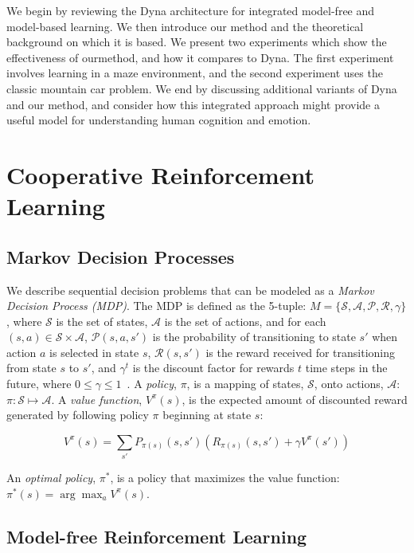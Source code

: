 \documentclass[letterpaper]{article}
\begin{document}
We begin by reviewing the Dyna architecture for integrated model-free and model-based learning. We then introduce our method and the theoretical background on which it is based. We present two experiments which show the effectiveness of ourmethod, and how it compares to Dyna. The first experiment involves learning in a maze environment, and the second experiment uses the classic mountain car problem. We end by discussing additional variants of Dyna and our method, and consider how this integrated approach might provide a useful model for understanding human cognition and emotion.

\section{Cooperative Reinforcement Learning}

\subsection{Markov Decision Processes}

We describe sequential decision problems that can be modeled as a \textit{Markov Decision Process (MDP)}. The MDP is defined as the 5-tuple: $M=\{\mathcal{S},\mathcal{A},\mathcal{P},\mathcal{R},\gamma\}$, where $\mathcal{S}$ is the set of states, $\mathcal{A}$ is the set of actions, and for each $(s,a) \in \mathcal{S} \times \mathcal{A}$, $\mathcal{P}(s,a,s')$ is the probability of transitioning to state $s'$ when action $a$ is selected in state $s$, $\mathcal{R}(s,s')$ is the reward received for transitioning from state $s$ to $s'$, and $\gamma^t$ is the discount factor for rewards $t$ time steps in the future, where $0\leq\gamma\leq1$~\cite{sutton1998reinforcement}. A \textit{policy}, $\pi$, is a mapping of states, $\mathcal{S}$, onto actions, $\mathcal{A}$: $\pi:\mathcal{S}\mapsto\mathcal{A}$. A \textit{value function}, $V^{\pi}(s)$, is the expected amount of discounted reward generated by following policy $\pi$ beginning at state $s$:

\begin{equation} 
V^{\pi}(s) = \sum\limits_{s'} P_{\pi(s)}(s,s')(R_{\pi(s)}(s,s')+\gamma V^{\pi}(s'))
\end{equation}

\noindent
An \textit{optimal policy}, $\pi^{*}$, is a policy that maximizes the value function: $\pi^{*}(s) = \arg\max_a V^{\pi}(s)$.

\subsection{Model-free Reinforcement Learning}
\end{document}

